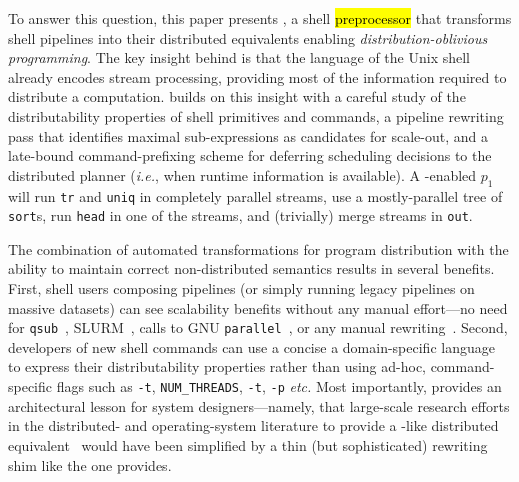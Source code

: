 \documentclass[sigplan,10pt,review,anonymous]{acmart}
\newcommand{\eg}{{\em e.g.}, }
\newcommand{\ie}{{\em i.e.}, }
\newcommand{\etc}{{\em etc.}\xspace}
\newcommand{\ttt}[1]{\texttt{\small #1}}
\newcommand{\todo}[1]{\hl{#1}\xspace}
\begin{document}


To answer this question, this paper presents \sys, a shell \todo{preprocessor} that transforms shell pipelines into their distributed equivalents enabling \emph{distribution-oblivious programming}.
The key insight behind \sys is that the language of the Unix shell already encodes stream processing, providing most of the information required to distribute a computation.
\sys builds on this insight with a careful study of the distributability properties of shell primitives and commands, a pipeline rewriting pass that identifies maximal sub-expressions as candidates for scale-out, and a late-bound command-prefixing scheme for deferring scheduling decisions to the distributed planner (\ie when runtime information is available).
A \sys-enabled $p_1$ will run \ttt{tr} and \ttt{uniq} in completely parallel streams, use a mostly-parallel tree of \ttt{sort}s, run \ttt{head} in one of the streams, and (trivially) merge streams in \ttt{out}.

The combination of automated transformations for program distribution with the ability to maintain correct non-distributed semantics results in several benefits.
First, shell users composing pipelines (or simply running legacy pipelines on massive datasets) can see scalability benefits without any manual effort---no need for \ttt{qsub}~\cite{gentzsch2001sun}, \textsc{SLURM}~\cite{yoo2003slurm}, calls to \textsc{GNU} \ttt{parallel}~\cite{Tange2011a}, or any manual rewriting~\cite{mapreduce:08, ciel:11, spark:12}.
Second, developers of new shell commands can use a concise a domain-specific language to express their distributability properties rather than using ad-hoc, command-specific flags such as {\tt -t},  {\tt NUM\_THREADS}, \ttt{-t}, \ttt{-p} \etc
Most importantly, \sys provides an architectural lesson for system designers---namely, that large-scale research efforts in the distributed- and operating-system literature to provide a \unix-like distributed equivalent~\cite{ousterhout1988sprite, mullender1990amoeba, pike1990plan9, barak1998mosix} would have been simplified by a thin (but sophisticated) rewriting shim like the one \sys provides.
\end{document}
